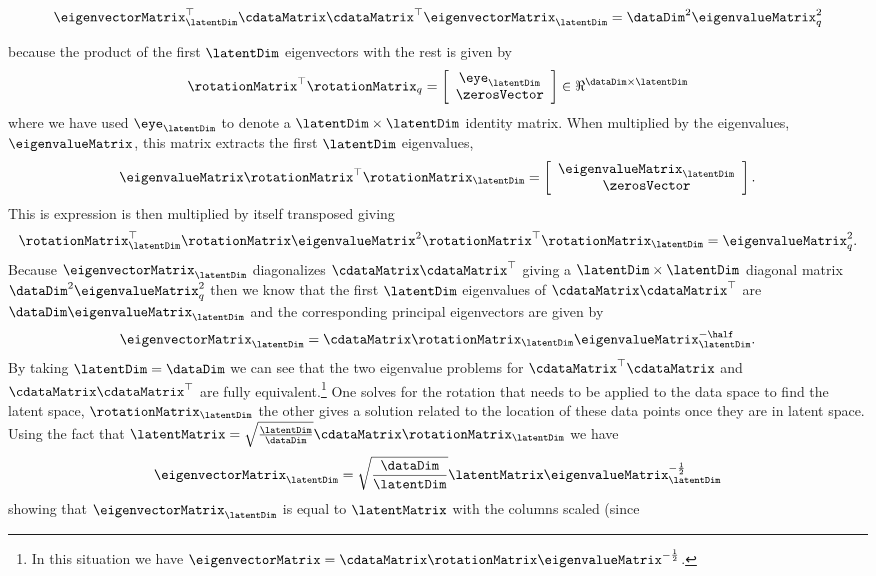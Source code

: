 \[
\eigenvectorMatrix_{\latentDim}^{\top}\cdataMatrix\cdataMatrix^{\top}\eigenvectorMatrix_{\latentDim}=\dataDim^2\eigenvalueMatrix_{q}^2
\]

because the product of the first $\latentDim$ eigenvectors with the rest is given by
\[
\rotationMatrix^{\top}\rotationMatrix_{q}=
\left[\begin{array}{c}
    \eye_{\latentDim}\\
    \zerosVector
  \end{array}\right]\in\Re^{\dataDim\times\latentDim}
\]
where we have used $\eye_{\latentDim}$ to denote a
$\latentDim\times\latentDim$ identity matrix. When multiplied by the eigenvalues, $\eigenvalueMatrix$, this matrix extracts the first $\latentDim$ eigenvalues,
\[
\eigenvalueMatrix\rotationMatrix^{\top}\rotationMatrix_{\latentDim}=\left[\begin{array}{c}
    \eigenvalueMatrix_{\latentDim}\\
    \zerosVector\end{array}\right].\]
This is expression is then multiplied by itself transposed giving 
\[
\rotationMatrix_{\latentDim}^{\top}\rotationMatrix\eigenvalueMatrix^{2}\rotationMatrix^{\top}\rotationMatrix_{\latentDim}=\eigenvalueMatrix_{q}^{2}.
\]
Because  $\eigenvectorMatrix_\latentDim$ diagonalizes $\cdataMatrix\cdataMatrix^\top$ giving a $\latentDim \times \latentDim$ diagonal matrix $\dataDim^2\eigenvalueMatrix_q^2$ then we know that the first $\latentDim$ eigenvalues of $\cdataMatrix\cdataMatrix^\top$ are $\dataDim\eigenvalueMatrix_\latentDim$ and the corresponding principal eigenvectors are given by 
\[
\eigenvectorMatrix_{\latentDim}=\cdataMatrix\rotationMatrix_{\latentDim}\eigenvalueMatrix_{\latentDim}^{-\half}.
\]
By taking $\latentDim=\dataDim$ we can see that the two eigenvalue
problems for $\cdataMatrix^\top\cdataMatrix$ and
$\cdataMatrix\cdataMatrix^\top$ are fully equivalent.\footnote{In this
  situation we have $\eigenvectorMatrix =
  \cdataMatrix\rotationMatrix\eigenvalueMatrix^{-\frac{1}{2}}$.} One
solves for the rotation that needs to be applied to the data space to
find the latent space, $\rotationMatrix_\latentDim$ the other gives a
solution related to the location of these data points once they are in
latent space. Using the fact that $\latentMatrix =
\sqrt{\frac{\latentDim}{\dataDim}}\cdataMatrix\rotationMatrix_\latentDim$
we have
\[
\eigenvectorMatrix_\latentDim = \sqrt{\frac{\dataDim}{\latentDim}}\latentMatrix \eigenvalueMatrix_\latentDim^{-\frac{1}{2}}
\]
showing that $\eigenvectorMatrix_\latentDim$ is equal to
$\latentMatrix$ with the columns scaled (since
